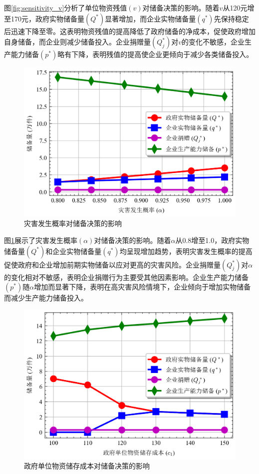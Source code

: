 \documentclass[a4paper,8pt,twocolumn]{article} %
\begin{document}
图\ref{fig:sensitivity_v}分析了单位物资残值$(v)$对储备决策的影响。随着$v$从120元增至170元，政府实物储备量$(Q^*)$显著增加，而企业实物储备量$(q^*)$先保持稳定后迅速下降至零。这表明物资残值的提高降低了政府储备的净成本，促使政府增加自身储备，而企业则减少储备投入。企业捐赠量$(Q_j^*)$对$v$的变化不敏感，企业生产能力储备$(p^*)$略有下降，表明残值的提高使企业更倾向于减少各类储备投入。
\begin{figure}[H]
\centering
\includegraphics[width=\linewidth]{basic_pictures/sensitivity_alpha.png}
\caption{灾害发生概率对储备决策的影响}
\label{fig:sensitivity_alpha}
\end{figure}
图\ref{fig:sensitivity_alpha}展示了灾害发生概率$(\alpha)$对储备决策的影响。随着$\alpha$从0.8增至1.0，政府实物储备量$(Q^*)$和企业实物储备量$(q^*)$均呈现增加趋势，表明灾害发生概率的提高促使政府和企业增加前期实物储备以应对更高的灾害风险。企业捐赠量$(Q_j^*)$对$\alpha$的变化相对不敏感，表明企业捐赠行为主要受其他因素影响。企业生产能力储备$(p^*)$随$\alpha$增加而显著下降，表明在高灾害风险情境下，企业倾向于增加实物储备而减少生产能力储备投入。
\begin{figure}[H]
\centering
\includegraphics[width=\linewidth]{basic_pictures/sensitivity_c1.png}
\caption{政府单位物资储存成本对储备决策的影响}
\label{fig:sensitivity_c1}
\end{figure}
\end{document}
